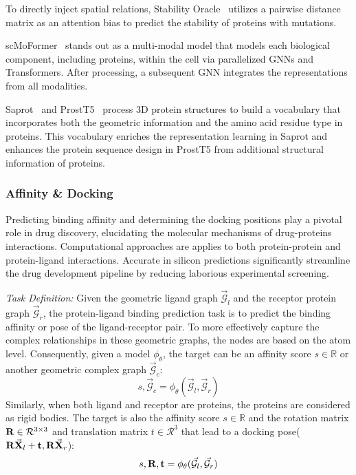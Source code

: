 To directly inject spatial relations, Stability Oracle~\cite{diaz2024stability} utilizes a pairwise distance matrix as an attention bias to predict the stability of proteins with mutations.

scMoFormer~\cite{tang2023single} stands out as a multi-modal model that models each biological component, including proteins, within the cell via parallelized GNNs and Transformers. After processing, a subsequent GNN integrates the representations from all modalities.

Saprot~\cite{su2024saprot} and ProstT5~\cite{10.1093/nargab/lqae150} process 3D protein structures to build a vocabulary that incorporates both the geometric information and the amino acid residue type in proteins. This vocabulary enriches the representation learning in Saprot and enhances the protein sequence design in ProstT5 from additional structural information of proteins.

\subsubsection{\textbf{Affinity \& Docking}}
Predicting binding affinity and determining the docking positions play a pivotal role in drug discovery, 
elucidating the molecular mechanisms of drug-proteins interactions.
Computational approaches are applies to both protein-protein and protein-ligand interactions. 
Accurate in silicon predictions significantly streamline the drug development pipeline by reducing laborious experimental screening. 

\textit{Task Definition:}
Given the geometric ligand graph $\mathcal{\vec{G}}_l$ and the receptor protein graph $\mathcal{\vec{G}}_r$, the protein-ligand binding prediction task is to predict the binding affinity or pose of the ligand-receptor pair. To more effectively capture the complex relationships in these geometric graphs, the nodes are based on the atom level. Consequently, given a model $\phi_\theta$, the target can be an affinity score $s \in \mathbb{R}$ or another geometric complex graph $\mathcal{\vec{G}}_c$:
\begin{equation}
    s, \mathcal{\vec{G}}_c = \phi_\theta(\mathcal{\vec{G}}_l, \mathcal{\vec{G}}_r)
\end{equation}
Similarly, when both ligand and receptor are proteins, the proteins are considered as rigid bodies. The target is also the affinity score $s \in \mathbb{R}$ and the rotation matrix $\mathbf{R} \in \mathcal{R}^{3 \times 3}$ and translation matrix $t \in \mathcal{R}^{3}$ that lead to a docking pose($\mathbf{R}\vec{\mathbf{X}}_l +\mathbf{t}, \mathbf{R}\vec{\mathbf{X}}_r$):
\begin{equation}
    s, \mathbf{R}, \mathbf{t} = \phi_\theta(\mathcal{\vec{G}}_l, \mathcal{\vec{G}}_r)
\end{equation}


